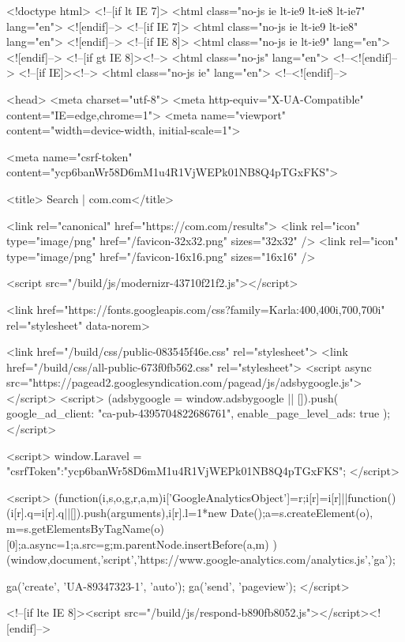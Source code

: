 <!doctype html>
<!--[if lt IE 7]>      <html class="no-js ie lt-ie9 lt-ie8 lt-ie7" lang="en"> <![endif]-->
<!--[if IE 7]>         <html class="no-js ie lt-ie9 lt-ie8" lang="en"> <![endif]-->
<!--[if IE 8]>         <html class="no-js ie lt-ie9" lang="en"> <![endif]-->
<!--[if gt IE 8]><!--> <html class="no-js" lang="en"> <!--<![endif]-->
<!--[if IE]><!--> <html class="no-js ie" lang="en"> <!--<![endif]-->

<head>
    <meta charset="utf-8">
    <meta http-equiv="X-UA-Compatible" content="IE=edge,chrome=1">
    <meta name="viewport" content="width=device-width, initial-scale=1">

    
    <meta name="csrf-token" content="ycp6banWr58D6mM1u4R1VjWEPk01NB8Q4pTGxFKS">

    <title>    Search
 | com.com</title>
    
    <link rel="canonical" href="https://com.com/results">
    <link rel="icon" type="image/png" href="/favicon-32x32.png" sizes="32x32" />
    <link rel="icon" type="image/png" href="/favicon-16x16.png" sizes="16x16" />

    
    <script src="/build/js/modernizr-43710f21f2.js"></script>

    <link href="https://fonts.googleapis.com/css?family=Karla:400,400i,700,700i" rel="stylesheet" data-norem>

        <link href="/build/css/public-083545f46e.css" rel="stylesheet">
    <link href="/build/css/all-public-673f0fb562.css" rel="stylesheet">
    <script async src="https://pagead2.googlesyndication.com/pagead/js/adsbygoogle.js"></script>
    <script>
        (adsbygoogle = window.adsbygoogle || []).push({
            google_ad_client: "ca-pub-4395704822686761",
            enable_page_level_ads: true
        });
    </script>
    
    <script>
      window.Laravel = {"csrfToken":"ycp6banWr58D6mM1u4R1VjWEPk01NB8Q4pTGxFKS"};
    </script>

    <script>
        (function(i,s,o,g,r,a,m){i['GoogleAnalyticsObject']=r;i[r]=i[r]||function(){
        (i[r].q=i[r].q||[]).push(arguments)},i[r].l=1*new Date();a=s.createElement(o),
        m=s.getElementsByTagName(o)[0];a.async=1;a.src=g;m.parentNode.insertBefore(a,m)
        })(window,document,'script','https://www.google-analytics.com/analytics.js','ga');

        ga('create', 'UA-89347323-1', 'auto');
        ga('send', 'pageview');
    </script>

    
    <!--[if lte IE 8]><script src="/build/js/respond-b890fb8052.js"></script><![endif]-->

